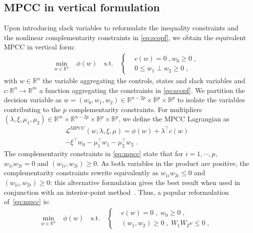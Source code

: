\documentclass{IEEEtran4PSCC}
\newcommand{\add}[1]{#1}
\begin{document}
\subsection{MPCC in vertical formulation}
\label{sec:mpcc:intro}
Upon introducing slack variables to reformulate the inequality constraints
and the nonlinear complementarity constraints in \eqref{eq:scopf}, we obtain
the equivalent MPCC in vertical form:
\begin{equation}
  \label{eq:mpcc}
  \begin{aligned}
    \min_{w \in \mathbb{R}^n} \; & \phi(w) \quad \text{s.t.} \quad \left\{
      \begin{aligned}
        & c(w) = 0 \; , w_0 \geq 0 \; , \\
        & 0 \leq w_1 \perp w_2 \geq 0 \; ,
      \end{aligned}
    \right.
  \end{aligned}
\end{equation}
with $w \in \mathbb{R}^n$ the variable aggregating the controls, states and slack variables
and $c: \mathbb{R}^n \to \mathbb{R}^m$ a function aggregating the constraints in \eqref{eq:scopf}.
We partition the decision variable as $w = (w_0, w_1, w_2) \in \mathbb{R}^{n-2p} \times
\mathbb{R}^p \times \mathbb{R}^p$ to isolate the variables contributing to the $p$ complementarity constraints.
For multipliers $(\lambda, \xi, \mu_1, \mu_2) \in \mathbb{R}^{m} \times \mathbb{R}^{n-2p} \times \mathbb{R}^p \times \mathbb{R}^p$, we define
the MPCC Lagrangian as
\begin{multline}
  \mathcal{L}^{\mathrm{MPCC}}(w, \lambda, \xi, \mu) = \phi(w) + \lambda^\top c(w) \\ - \xi^\top w_0 - \mu_1^\top w_1 - \mu_2^\top w_2 \; .
\end{multline}
\add{The complementarity constraints in \eqref{eq:mpcc} state that for $i=1,\cdots,p$, $w_{1i} w_{2i} = 0$
and $(w_{1i}, w_{2i}) \geq 0$. As both variables in the product are positive,
the complementarity constraints rewrite equivalently as $w_{1i} w_{2i} \leq 0$
and $(w_{1i}, w_{2i}) \geq 0$: this alternative formulation
gives the best result when used in conjunction with an interior-point method~\cite{leyffer2006interior}.
Thus, a popular reformulation of~\eqref{eq:mpcc} is:}
\begin{equation}
  \label{eq:mpccnlp}
  \begin{aligned}
    \min_{w \in \mathbb{R}^n} \; & \phi(w) \quad \text{s.t.} \quad
    \left\{
    \begin{aligned}
      & c(w) = 0 \; , \; w_0 \geq 0 \; , \\
      & (w_1, w_2) \geq 0 \; , \; W_1 W_2 e \leq 0 \; ,
    \end{aligned}
    \right.
  \end{aligned}
\end{equation}
\end{document}
